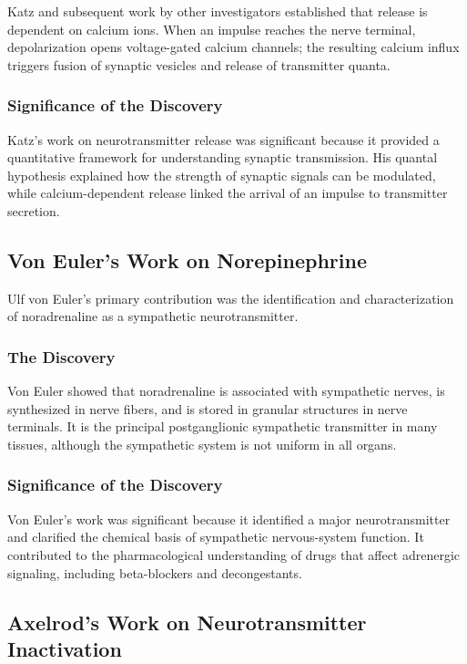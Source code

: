 Katz and subsequent work by other investigators established that release is dependent on calcium ions. When an impulse reaches the nerve terminal, depolarization opens voltage-gated calcium channels; the resulting calcium influx triggers fusion of synaptic vesicles and release of transmitter quanta.

\subsubsection{Significance of the Discovery}

Katz's work on neurotransmitter release was significant because it provided a quantitative framework for understanding synaptic transmission. His quantal hypothesis explained how the strength of synaptic signals can be modulated, while calcium-dependent release linked the arrival of an impulse to transmitter secretion.

\subsection{Von Euler's Work on Norepinephrine}

Ulf von Euler's primary contribution was the identification and characterization of noradrenaline as a sympathetic neurotransmitter.

\subsubsection{The Discovery}

Von Euler showed that noradrenaline is associated with sympathetic nerves, is synthesized in nerve fibers, and is stored in granular structures in nerve terminals. It is the principal postganglionic sympathetic transmitter in many tissues, although the sympathetic system is not uniform in all organs.

\subsubsection{Significance of the Discovery}

Von Euler's work was significant because it identified a major neurotransmitter and clarified the chemical basis of sympathetic nervous-system function. It contributed to the pharmacological understanding of drugs that affect adrenergic signaling, including beta-blockers and decongestants.

\subsection{Axelrod's Work on Neurotransmitter Inactivation}

